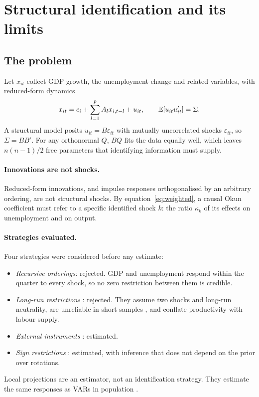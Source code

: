 \section{Structural identification and its limits}\label{sec:identification}

\subsection{The problem}

Let $x_{it}$ collect GDP growth, the unemployment change and related variables, with
reduced-form dynamics
\[
  x_{it}=c_i+\sum_{l=1}^{p}A_l x_{i,t-l}+u_{it},\qquad \mathbb{E}[u_{it}u_{it}']=\Sigma .
\]
A structural model posits $u_{it}=B\varepsilon_{it}$ with mutually uncorrelated shocks
$\varepsilon_{it}$, so $\Sigma=BB'$. For any orthonormal $Q$, $BQ$ fits the data equally
well, which leaves $n(n-1)/2$ free parameters that identifying information must supply.

\paragraph{Innovations are not shocks.} Reduced-form innovations, and impulse responses
orthogonalised by an arbitrary ordering, are not structural shocks. By
equation~\eqref{eq:weighted}, a causal Okun coefficient must refer to a specific identified
shock $k$: the ratio $\kappa_k$ of its effects on unemployment and on output.

\paragraph{Strategies evaluated.} Four strategies were considered before any estimate:
\begin{itemize}
  \item \emph{Recursive orderings:} rejected. GDP and unemployment respond within the
    quarter to every shock, so no zero restriction between them is credible.
  \item \emph{Long-run restrictions} \citep{blanchard1989quah}: rejected. They assume two
    shocks and long-run neutrality, are unreliable in short samples
    \citep{faust1997longrun}, and conflate productivity with labour supply.
  \item \emph{External instruments} \citep{stock2018external}: estimated.
  \item \emph{Sign restrictions} \citep{rubio2010svar}: estimated, with inference that
    does not depend on the prior over rotations.
\end{itemize}
Local projections \citep{jorda2005lp} are an estimator, not an identification strategy.
They estimate the same responses as VARs in population \citep{plagborg2021lpvar}.

